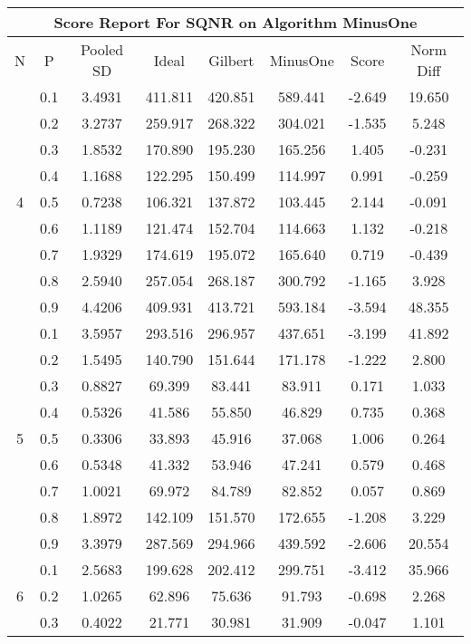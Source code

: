 \documentclass[11pt,a4paper]{report}
\begin{document}
\begin{longtable}{ | c | c || c | c | c | c | c | c | }
\hline
\multicolumn{8}{|c|}{ Score Report For SQNR on Algorithm MinusOne} \\
\hline
N & P & Pooled SD &  Ideal &  Gilbert & MinusOne  & Score & Norm Diff \\
 \hline
 \hline
 \endhead
\multirow{9}{*}{4} & 0.1 & 3.4931 & 411.811 & 420.851 & 589.441 & -2.649 & 19.650 \\
 & 0.2 & 3.2737 & 259.917 & 268.322 & 304.021 & -1.535 & 5.248 \\
 & 0.3 & 1.8532 & 170.890 & 195.230 & 165.256 & 1.405 & -0.231 \\
 & 0.4 & 1.1688 & 122.295 & 150.499 & 114.997 & 0.991 & -0.259 \\
 & 0.5 & 0.7238 & 106.321 & 137.872 & 103.445 & 2.144 & -0.091 \\
 & 0.6 & 1.1189 & 121.474 & 152.704 & 114.663 & 1.132 & -0.218 \\
 & 0.7 & 1.9329 & 174.619 & 195.072 & 165.640 & 0.719 & -0.439 \\
 & 0.8 & 2.5940 & 257.054 & 268.187 & 300.792 & -1.165 & 3.928 \\
 & 0.9 & 4.4206 & 409.931 & 413.721 & 593.184 & -3.594 & 48.355 \\
 \hline
\multirow{9}{*}{5} & 0.1 & 3.5957 & 293.516 & 296.957 & 437.651 & -3.199 & 41.892 \\
 & 0.2 & 1.5495 & 140.790 & 151.644 & 171.178 & -1.222 & 2.800 \\
 & 0.3 & 0.8827 & 69.399 & 83.441 & 83.911 & 0.171 & 1.033 \\
 & 0.4 & 0.5326 & 41.586 & 55.850 & 46.829 & 0.735 & 0.368 \\
 & 0.5 & 0.3306 & 33.893 & 45.916 & 37.068 & 1.006 & 0.264 \\
 & 0.6 & 0.5348 & 41.332 & 53.946 & 47.241 & 0.579 & 0.468 \\
 & 0.7 & 1.0021 & 69.972 & 84.789 & 82.852 & 0.057 & 0.869 \\
 & 0.8 & 1.8972 & 142.109 & 151.570 & 172.655 & -1.208 & 3.229 \\
 & 0.9 & 3.3979 & 287.569 & 294.966 & 439.592 & -2.606 & 20.554 \\
 \hline
\multirow{9}{*}{6} & 0.1 & 2.5683 & 199.628 & 202.412 & 299.751 & -3.412 & 35.966 \\
 & 0.2 & 1.0265 & 62.896 & 75.636 & 91.793 & -0.698 & 2.268 \\
 & 0.3 & 0.4022 & 21.771 & 30.981 & 31.909 & -0.047 & 1.101 \\

\end{longtable}
\end{document}
